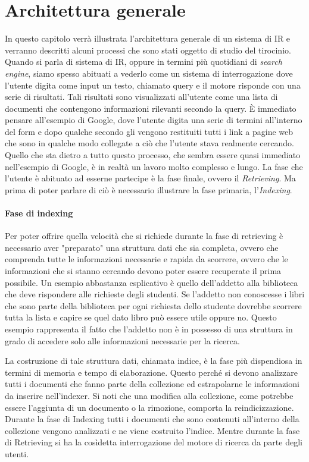 \section{Architettura generale}
In questo capitolo verrà illustrata l'architettura generale di un sistema di IR e verranno
descritti alcuni processi che sono stati oggetto di studio del tirocinio.
Quando si parla di sistema di IR, oppure in termini più quotidiani di \textit{search engine},
siamo spesso abituati a vederlo come un sistema di interrogazione dove l'utente
digita come input un testo, chiamato query e il motore risponde con una serie di risultati. Tali risultati
sono visualizzati all'utente come una lista di documenti che contengono informazioni
rilevanti secondo la query.
\`E immediato pensare all'esempio di Google, dove l'utente digita una serie di termini
all'interno del  form e dopo qualche secondo gli vengono restituiti tutti i link a pagine web che
sono in qualche modo collegate a ciò che l'utente stava realmente cercando.
Quello che sta dietro a tutto questo processo, che sembra essere quasi immediato nell'esempio di Google, è
in realtà un lavoro molto complesso e lungo.
La fase che l'utente è abituato ad esserne partecipe è la fase finale, ovvero
il \textit{Retrieving}. Ma prima di poter parlare di ciò è necessario illustrare la fase primaria, l'\textit{Indexing}.

\paragraph{Fase di indexing}
Per poter offrire quella velocità che si richiede durante la fase di retrieving è necessario aver "preparato"
una struttura dati che sia completa, ovvero che comprenda tutte le informazioni necessarie e 
rapida da scorrere, ovvero che le informazioni che si stanno cercando devono poter essere recuperate
il prima possibile.  Un esempio abbastanza esplicativo è quello dell'addetto alla biblioteca che deve rispondere
alle richieste degli studenti. Se l'addetto non conoscesse i libri che sono parte della biblioteca per ogni richiesta
dello studente dovrebbe scorrere tutta la lista e capire se quel dato libro può essere utile oppure no.
Questo esempio rappresenta il fatto che l'addetto non è in possesso di una struttura in grado
di accedere solo alle informazioni necessarie per la ricerca.

La costruzione di tale struttura dati, chiamata indice, è la fase più dispendiosa in termini di memoria e tempo di elaborazione.
Questo perché si devono analizzare tutti i documenti
che fanno parte della collezione ed estrapolarne le informazioni da inserire nell'indexer.
Si noti che una modifica alla collezione, come potrebbe essere l'aggiunta di un documento o la rimozione, comporta
la reindicizzazione.
Durante la fase di Indexing tutti i documenti che sono contenuti all'interno della collezione vengono analizzati e ne viene costruito l'indice.
Mentre durante la fase di Retrieving si ha la cosìdetta interrogazione del motore di ricerca da parte degli utenti.



